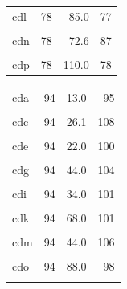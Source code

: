 \begin{table}
\begin{tabular}[t]{lrrr}
cdl & 78 & 85.0 & 77\\
\cellcolor{gray!6}{cdm} & \cellcolor{gray!6}{78} & \cellcolor{gray!6}{44.0} & \cellcolor{gray!6}{78}\\
cdn & 78 & 72.6 & 87\\
\cellcolor{gray!6}{cdo} & \cellcolor{gray!6}{78} & \cellcolor{gray!6}{88.0} & \cellcolor{gray!6}{85}\\
cdp & 78 & 110.0 & 78\\
\bottomrule
\end{tabular}
\centering
\begin{tabular}[t]{lrrr}
\toprule
\cellcolor{gray!6}{Model} & \cellcolor{gray!6}{$Z_{UP}$} & \cellcolor{gray!6}{$\Phi$} & \cellcolor{gray!6}{$Z_{cpl}$}\\
\midrule
cda & 94 & 13.0 & 95\\
\cellcolor{gray!6}{cdb} & \cellcolor{gray!6}{94} & \cellcolor{gray!6}{21.5} & \cellcolor{gray!6}{101}\\
cdc & 94 & 26.1 & 108\\
\cellcolor{gray!6}{cdd} & \cellcolor{gray!6}{94} & \cellcolor{gray!6}{32.6} & \cellcolor{gray!6}{113}\\
cde & 94 & 22.0 & 100\\
\cellcolor{gray!6}{cdf} & \cellcolor{gray!6}{94} & \cellcolor{gray!6}{36.3} & \cellcolor{gray!6}{104}\\
cdg & 94 & 44.0 & 104\\
\cellcolor{gray!6}{cdh} & \cellcolor{gray!6}{94} & \cellcolor{gray!6}{55.0} & \cellcolor{gray!6}{104}\\
cdi & 94 & 34.0 & 101\\
\cellcolor{gray!6}{cdj} & \cellcolor{gray!6}{94} & \cellcolor{gray!6}{56.1} & \cellcolor{gray!6}{102}\\
cdk & 94 & 68.0 & 101\\
\cellcolor{gray!6}{cdl} & \cellcolor{gray!6}{94} & \cellcolor{gray!6}{85.0} & \cellcolor{gray!6}{107}\\
cdm & 94 & 44.0 & 106\\
\cellcolor{gray!6}{cdn} & \cellcolor{gray!6}{94} & \cellcolor{gray!6}{72.6} & \cellcolor{gray!6}{102}\\
cdo & 94 & 88.0 & 98\\
\cellcolor{gray!6}{cdp} & \cellcolor{gray!6}{94} & \cellcolor{gray!6}{110.0} & \cellcolor{gray!6}{108}\\
\bottomrule
\end{tabular}
\end{table}

